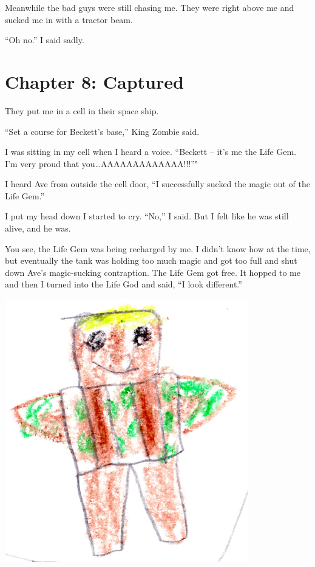 \documentclass[12pt,oneside]{krantz}
\begin{document}
Meanwhile the bad guys were still chasing me. They were right above me
and sucked me in with a tractor beam.

``Oh no.'' I said sadly.

\hypertarget{chapter-8-captured}{%
\chapter*{Chapter 8: Captured}\label{chapter-8-captured}}


They put me in a cell in their space ship.

``Set a course for Beckett's base,'' King Zombie said.

I was sitting in my cell when I heard a voice. ``Beckett -- it's me the
Life Gem. I'm very proud that you\ldots{}AAAAAAAAAAAAA!!!''"

I heard Ave from outside the cell door, ``I successfully sucked the
magic out of the Life Gem.''

I put my head down I started to cry. ``No,'' I said. But I felt like he
was still alive, and he was.

You see, the Life Gem was being recharged by me. I didn't know how at
the time, but eventually the tank was holding too much magic and got too
full and shut down Ave's magic-sucking contraption. The Life Gem got
free. It hopped to me and then I turned into the Life God and said, ``I
look different.''

\includegraphics[width=4.16667in,height=\textheight]{img/lifegod.jpg}
\end{document}
